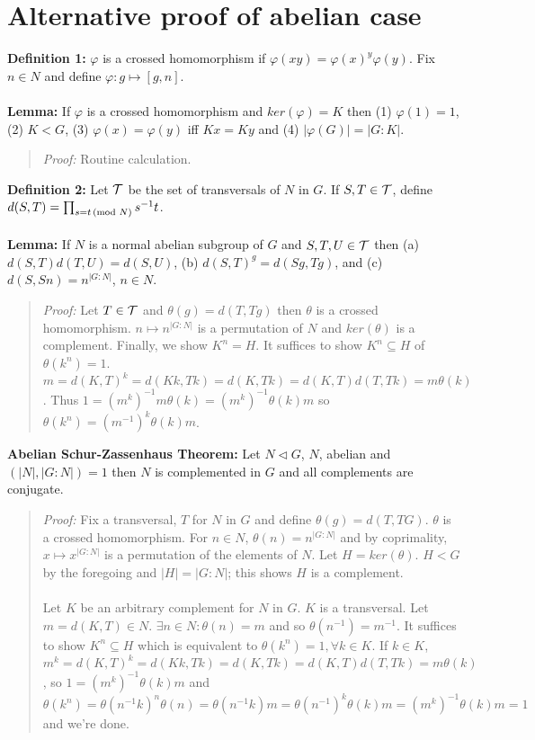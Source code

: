 \section {Alternative proof of abelian case}
{\bf Definition 1:} $\varphi$ is a crossed homomorphism if $\varphi(xy)= \varphi(x)^y \varphi(y)$.
Fix $n \in N$ and define $\varphi: g \mapsto [g, n]$.\\
\\
{\bf Lemma:}  If $\varphi$ is a crossed homomorphism and $ker(\varphi)=K$ then (1) $\varphi(1)=1$,
(2) $K<G$, (3) $\varphi(x)=\varphi(y)$ iff $Kx=Ky$ and (4) $|\varphi(G)|=|G:K|$.
\begin{quote}
\emph{Proof:}  Routine calculation.
\end{quote}
{\bf Definition 2:}  Let ${\cal T}$ be the set of transversals of $N$ in $G$.  If
$S, T \in {\cal T}$, define $d(S,T)= \prod_{s=t \thinspace \textnormal{(mod } N \textnormal{)}} s^{-1}t$.
\\
\\
{\bf Lemma:}  If $N$ is a normal abelian subgroup of $G$ and $S, T, U \in {\cal T}$
then (a) $d(S,T)d(T,U)=d(S,U)$, (b) $d(S,T)^g=d(Sg,Tg)$, and (c) $d(S, Sn)= n^{|G:N|}$,
$n \in N$.
\begin{quote}
\emph{Proof:}  
Let $T \in {\cal T}$ and $\theta(g)= d(T,Tg)$ then $\theta$ is a crossed
homomorphism.  $n \mapsto n^{|G:N|}$ is a permutation of $N$ and $ker(\theta)$ is a complement.
Finally, we show $K^n=H$.  It suffices to show $K^n \subseteq H$ of $\theta(k^n)=1$.
$m=d(K,T)^k=d(Kk, Tk)=d(K,Tk)=d(K, T) d(T, Tk)=m \theta(k)$.  Thus
$1= (m^k)^{-1} m \theta(k)=(m^k)^{-1} \theta(k)m$ so
$\theta(k^n)=(m^{-1})^k \theta(k)m$.
\end{quote}
{\bf Abelian Schur-Zassenhaus Theorem:}  Let $N \lhd G$, $N$, abelian and $(|N|,|G:N|)=1$ then $N$ is complemented in
$G$ and all complements are conjugate.
\begin{quote}
\emph{Proof:}  
Fix a transversal, $T$ for $N$ in $G$ and define $\theta(g)= d(T, TG)$.
$\theta$ is a crossed homomorphism.  For $n \in N$, $\theta(n)= n^{|G:N|}$ and by
coprimality, $x \mapsto x^{|G:N|}$ is a permutation of the elements of $N$.  Let
$H= ker(\theta)$.  $H <G$ by the foregoing and $|H|= |G:N|$; this shows $H$ is a complement.
\\
\\
Let $K$ be an arbitrary complement for $N$ in $G$.  $K$ is a transversal.  Let $m= d(K,T) \in N$.
$\exists n \in N: \theta(n)= m$ and so $\theta(n^{-1})= m^{-1}$.  It suffices to show
$K^n \subseteq H$ which is equivalent to $\theta(k^n)=1, \forall k \in K$.
If $k \in K$,
$m^k = d(K, T)^k = d(Kk, Tk) = d(K, Tk) = d(K, T) d(T, Tk)= m \theta(k)$,
so $1= (m^k)^{-1} \theta(k) m$ and
$\theta(k^n)= \theta(n^{-1}k)^n \theta(n) = \theta(n^{-1}k) m = 
\theta(n^{-1})^k \theta(k) m = (m^k)^{-1} \theta(k) m = 1$ and we're done.
\end{quote}
